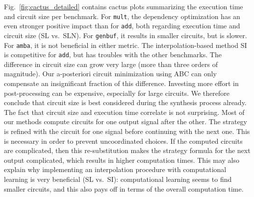 \documentclass[conference]{IEEEtran}
\newcommand{\Abc}{\textsf{ABC}\xspace}
\begin{document}
\begin{figure*}
\centering
   \caption{Cactus plots summarizing execution time and circuit size per 
            benchmark.}
  \label{fig:cactus_detailed}
\end{figure*}

\noindent
Fig.~\ref{fig:cactus_detailed} contains cactus plots summarizing the execution 
time and circuit size per benchmark.  For \texttt{mult}, the dependency 
optimization has an even stronger positive impact than for \texttt{add}, both 
regarding execution time and circuit size (\textsf{SL} vs.~\textsf{SLN}).  For 
\texttt{genbuf}, it results in smaller circuits, but is slower. For 
\texttt{amba}, it is not beneficial in either metric.  The interpolation-based 
method \textsf{SI} is competitive for \texttt{add}, but has
troubles with the other benchmarks.  The difference in circuit size can grow 
very large (more than three orders of magnitude).  Our a-posteriori circuit 
minimization using \Abc can only compensate an insignificant fraction of 
this difference.  Investing more effort in post-processing can be expensive, 
especially for large circuits.  We therefore conclude that circuit size is 
best considered during the synthesis process already.  The fact that circuit 
size and execution time correlate is not surprising.  Most of our methods 
compute circuits for one output signal after the other. The strategy is refined 
with the circuit for one signal before continuing with the next one. This is 
necessary in order to prevent uncoordinated choices.  If the computed circuits 
are complicated, then this re-substitution makes the strategy formula for the 
next output complicated, which results in higher computation times.  This 
may also explain why implementing an interpolation procedure with computational 
learning is very beneficial (\textsf{SL} vs.~\textsf{SI}): computational 
learning seems to find smaller circuits, and this also pays off in terms of the 
overall computation time.
\end{document}
